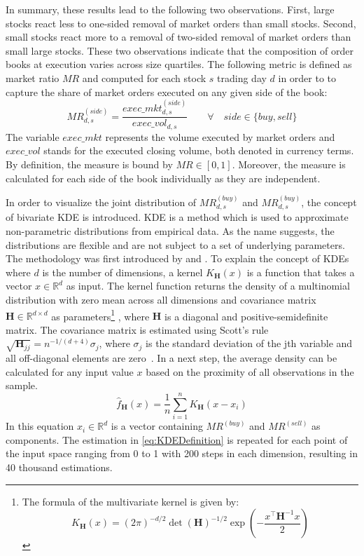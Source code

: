 \documentclass[11pt,a4paper]{article}
\begin{document}
    In summary, these results lead to the following two observations. First, large stocks react less to one-sided removal of market orders than small stocks. Second, small stocks react more to a removal of two-sided removal of market orders than small large stocks. These two observations indicate that the composition of order books at execution varies across size quartiles. The following metric is defined as market ratio $MR$ and computed for each stock $s$ trading day $d$ in order to to capture the share of market orders executed on any given side of the book:
    \begin{equation*}
        MR^{(side)}_{d,s} = \frac{exec\_mkt^{(side)}_{d,s}}{exec\_vol_{d,s}}
        \qquad \forall \quad side\in \{buy, sell\}
    \end{equation*}
    The variable $exec\_mkt$ represents the volume executed by market orders and $exec\_vol$ stands for the executed closing volume, both denoted in currency terms. By definition, the measure is bound by $MR \in [0, 1]$. Moreover, the measure is calculated for each side of the book individually as they are independent.

    In order to visualize the joint distribution of $MR^{(buy)}_{d,s}$ and $MR^{(buy)}_{d,s}$, the concept of bivariate \ac{KDE} is introduced. \Ac{KDE} is a method which is used to approximate non-parametric distributions from empirical data. As the name suggests, the distributions are flexible and are not subject to a set of underlying parameters. The methodology was first introduced by \textcite{Rosenblatt1956} and \textcite{Parzen1962}. To explain the concept of \acp{KDE} where $d$ is the number of dimensions, a kernel $K_\mathbf{H} (x)$ is a function that takes a vector $x \in \mathbb{R}^d$ as input. The kernel function returns the density of a multinomial distribution with zero mean across all dimensions and covariance matrix $\mathbf{H} \in \mathbb{R}^{d \times d}$ as parameters\footnote{The formula of the multivariate kernel is given by: \[K_\mathbf{H} (x) = (2 \pi)^{-d/2} \det \left( \mathbf{H} \right)^{-1/2} \exp \left(- \frac{x^\intercal \mathbf{H}^{-1} x}{2}  \right) \]}
    , where $\mathbf{H}$ is a diagonal and positive-semidefinite matrix. The covariance matrix is estimated using Scott's rule $\sqrt {\mathbf{H}_{jj}} = n^{-1/(d+4)} \sigma_j$, where $\sigma_j$ is the standard deviation of the jth variable and all off-diagonal elements are zero\ \parencite{Scott1979}. In a next step, the average density can be calculated for any input value $x$ based on the proximity of all observations in the sample.
    \begin{equation} \label{eq:KDEDefinition}
        \hat{f}_\mathbf{H}(x) = \frac{1}{n} \sum_{i=1}^{n} K_\mathbf{H} (x-x_i)
    \end{equation}
    In this equation $x_i \in \mathbb{R}^d$ is a vector containing $MR^{(buy)}$ and $MR^{(sell)}$ as components. The estimation in \cref{eq:KDEDefinition} is repeated for each point of the input space ranging from 0 to 1 with 200 steps in each dimension, resulting in 40 thousand estimations.
\end{document}
